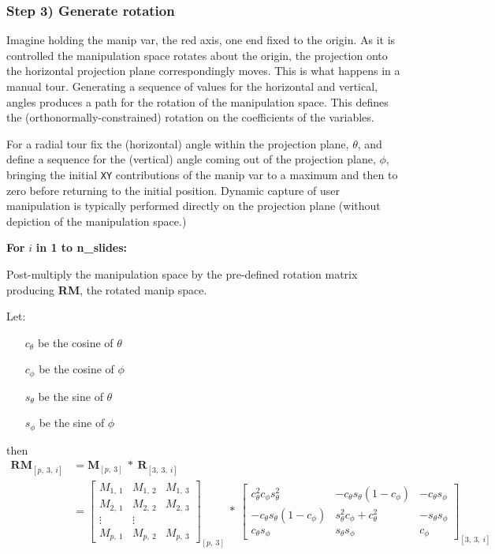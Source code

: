 \hypertarget{step-3-generate-rotation}{%
\subsubsection{Step 3) Generate rotation}\label{step-3-generate-rotation}}

Imagine holding the manip var, the red axis, one end fixed to the origin. As it is controlled the manipulation space rotates about the origin, the projection onto the horizontal projection plane correspondingly moves. This is what happens in a manual tour. Generating a sequence of values for the horizontal and vertical, angles produces a path for the rotation of the manipulation space. This defines the (orthonormally-constrained) rotation on the coefficients of the variables.

For a radial tour fix the (horizontal) angle within the projection plane, \(\theta\), and define a sequence for the (vertical) angle coming out of the projection plane, \(\phi\), bringing the initial \texttt{XY} contributions of the manip var to a maximum and then to zero before returning to the initial position. Dynamic capture of user manipulation is typically performed directly on the projection plane (without depiction of the manipulation space.)

\textbf{For } \(i\) \textbf{in 1 to n\_slides:}

Post-multiply the manipulation space by the pre-defined rotation matrix producing \textbf{RM}, the rotated manip space.

Let:

\begin{itemize}
  \item[$c_\theta$] be the cosine of $\theta$
  \item[$c_\phi$]   be the cosine of $\phi$
  \item[$s_\theta$] be the sine of   $\theta$
  \item[$s_\phi$]   be the sine of   $\phi$
\end{itemize}

then
\begin{align*}
  \textbf{RM}_{[p,~3,~i]}
  &= \textbf{M}_{[p,~3]} ~*~ \textbf{R}_{[3,~3,~i]} \\
  &= \begin{bmatrix}
    M_{1,~1} & M_{1,~2} & M_{1,~3} \\
    M_{2,~1} & M_{2,~2} & M_{2,~3} \\
    \vdots   & \vdots   \\
    M_{p,~1} & M_{p,~2} & M_{p,~3}
  \end{bmatrix}_{[p,~3]}
    ~*~
  \begin{bmatrix}
    c_\theta^2 c_\phi s_\theta^2 &
    -c_\theta s_\theta (1 - c_\phi) &
    -c_\theta s_\phi \\
    -c_\theta s_\theta (1 - c_\phi) &
    s_\theta^2 c_\phi + c_\theta^2 &
    -s_\theta s_\phi \\
    c_\theta s_\phi &
    s_\theta s_\phi &
    c_\phi
  \end{bmatrix}_{[3,~3,~i]}
\end{align*}

